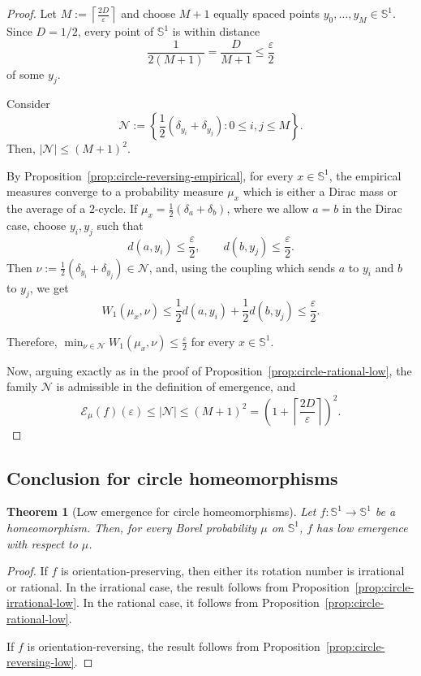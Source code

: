\documentclass[12pt,a4paper,twoside]{article}
\theoremstyle{plain}
\newtheorem{theorem}{Theorem}[section]
\theoremstyle{definition}
\newcommand{\cE}{{\mathcal E}}
\begin{document}
\begin{proof}
Let $M:=\left\lceil\frac{2D}{\varepsilon}\right\rceil$
and choose \(M+1\) equally spaced points $y_0,\dots,y_M\in\mathbb S^1$. Since \(D=1/2\), every point of \(\mathbb S^1\) is within distance
\[
\frac{1}{2(M+1)}
=
\frac{D}{M+1}
\le
\frac{\varepsilon}{2}
\]
of some \(y_j\).

Consider
\[
\mathcal N
:=
\left\{
\frac12(\delta_{y_i}+\delta_{y_j}):
0\le i,j\le M
\right\}.
\]
Then, $|\mathcal N|\le(M+1)^2$.


By Proposition~\ref{prop:circle-reversing-empirical}, for every
\(x\in\mathbb S^1\), the empirical measures converge to a probability
measure \(\mu_x\) which is either a Dirac mass or the average of a
\(2\)-cycle. If $\mu_x=\frac12(\delta_a+\delta_b)$, where we allow \(a=b\) in the Dirac case, choose \(y_i,y_j\) such that
\[
d(a,y_i)\le\frac{\varepsilon}{2},
\qquad
d(b,y_j)\le\frac{\varepsilon}{2}.
\]
Then $\nu:=\frac12(\delta_{y_i}+\delta_{y_j})
\in\mathcal N$, and, using the coupling which sends \(a\) to \(y_i\) and \(b\) to
\(y_j\), we get
\[
W_1(\mu_x,\nu)
\le
\frac12 d(a,y_i)+\frac12 d(b,y_j)
\leq
\frac{\varepsilon}{2}.
\]

Therefore, $\min_{\nu\in\mathcal N}W_1(\mu_x,\nu)
\le
\frac{\varepsilon}{2}$ for every $x\in\mathbb S^1$.

Now, arguing exactly as in the proof of
Proposition~\ref{prop:circle-rational-low}, the family \(\mathcal N\) is
admissible in the definition of emergence, and
\[
\cE_\mu(f)(\varepsilon)
\le
|\mathcal N|
\le
(M+1)^2
=
\left(
1+\left\lceil\frac{2D}{\varepsilon}\right\rceil
\right)^2.
\]
\end{proof}

\subsection{Conclusion for circle homeomorphisms}

\begin{theorem}[Low emergence for circle homeomorphisms]
\label{thm:circle-homeomorphisms-low}
Let \(f:\mathbb S^1\to\mathbb S^1\) be a homeomorphism. Then, for every
Borel probability \(\mu\) on \(\mathbb S^1\), \(f\) has low emergence with respect to \(\mu\).
\end{theorem}

\begin{proof}
If \(f\) is orientation-preserving, then either its rotation number is
irrational or rational. In the irrational case, the result follows from
Proposition~\ref{prop:circle-irrational-low}. In the rational case, it
follows from Proposition~\ref{prop:circle-rational-low}.

If \(f\) is orientation-reversing, the result follows from
Proposition~\ref{prop:circle-reversing-low}.
\end{proof}
\end{document}

